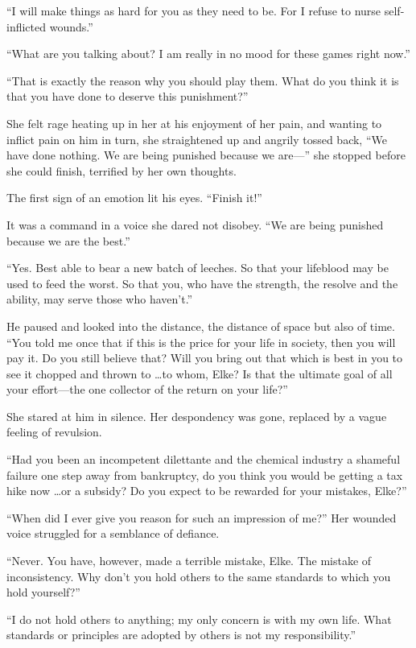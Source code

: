 ``I will make things as hard for you as they need to be. For I refuse to nurse self-inflicted wounds.''

``What are you talking about? I am really in no mood for these games right now.''

``That is exactly the reason why you should play them. What do you think it is that you have done to deserve this punishment?''

She felt rage heating up in her at his enjoyment of her pain, and wanting to inflict pain on him in turn, she straightened up and angrily tossed back, ``We have done nothing. We are being punished because we are---'' she stopped before she could finish, terrified by her own thoughts.

The first sign of an emotion lit his eyes. ``Finish it!''

It was a command in a voice she dared not disobey. ``We are being punished because we are the best.''

``Yes. Best able to bear a new batch of leeches. So that your lifeblood may be used to feed the worst. So that you, who have the strength, the resolve and the ability, may serve those who haven't.''

He paused and looked into the distance, the distance of space but also of time. ``You told me once that if this is the price for your life in society, then you will pay it. Do you still believe that? Will you bring out that which is best in you to see it chopped and thrown to \ldots to whom, Elke? Is that the ultimate goal of all your effort---the one collector of the return on your life?''

She stared at him in silence. Her despondency was gone, replaced by a vague feeling of revulsion.

``Had you been an incompetent dilettante and the chemical industry a shameful failure one step away from bankruptcy, do you think you would be getting a tax hike now \ldots or a subsidy? Do you expect to be rewarded for your mistakes, Elke?''

``When did I ever give you reason for such an impression of me?'' Her wounded voice struggled for a semblance of defiance.

``Never. You have, however, made a terrible mistake, Elke. The mistake of inconsistency. Why don't you hold others to the same standards to which you hold yourself?''

``I do not hold others to anything; my only concern is with my own life. What standards or principles are adopted by others is not my responsibility.''

